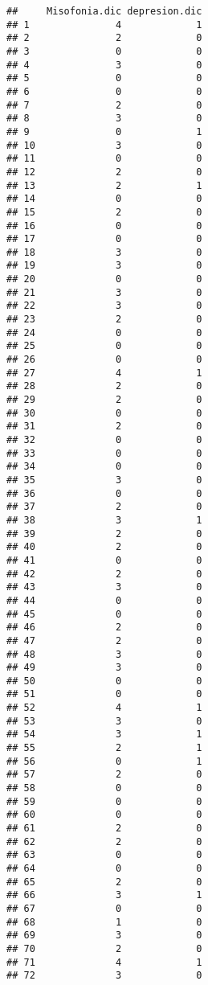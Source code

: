 \documentclass[
]{book}
\begin{document}
\begin{verbatim}
##     Misofonia.dic depresion.dic
## 1               4             1
## 2               2             0
## 3               0             0
## 4               3             0
## 5               0             0
## 6               0             0
## 7               2             0
## 8               3             0
## 9               0             1
## 10              3             0
## 11              0             0
## 12              2             0
## 13              2             1
## 14              0             0
## 15              2             0
## 16              0             0
## 17              0             0
## 18              3             0
## 19              3             0
## 20              0             0
## 21              3             0
## 22              3             0
## 23              2             0
## 24              0             0
## 25              0             0
## 26              0             0
## 27              4             1
## 28              2             0
## 29              2             0
## 30              0             0
## 31              2             0
## 32              0             0
## 33              0             0
## 34              0             0
## 35              3             0
## 36              0             0
## 37              2             0
## 38              3             1
## 39              2             0
## 40              2             0
## 41              0             0
## 42              2             0
## 43              3             0
## 44              0             0
## 45              0             0
## 46              2             0
## 47              2             0
## 48              3             0
## 49              3             0
## 50              0             0
## 51              0             0
## 52              4             1
## 53              3             0
## 54              3             1
## 55              2             1
## 56              0             1
## 57              2             0
## 58              0             0
## 59              0             0
## 60              0             0
## 61              2             0
## 62              2             0
## 63              0             0
## 64              0             0
## 65              2             0
## 66              3             1
## 67              0             0
## 68              1             0
## 69              3             0
## 70              2             0
## 71              4             1
## 72              3             0

\end{verbatim}
\end{document}

